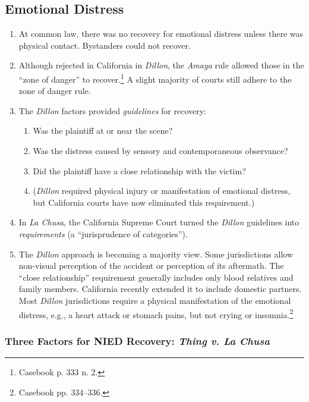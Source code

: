 \subsection{Emotional Distress}

\begin{enumerate}
    \item At common law, there was no recovery for emotional distress unless 
    there was physical contact. Bystanders could not recover.
    \item Although rejected in California in \emph{Dillon}, the \emph{Amaya} 
    rule allowed those in the ``zone of danger'' to recover.\footnote{Casebook 
    p. 333 n. 2.} A slight majority of courts still adhere to the zone of  
    danger rule.
    \item The \emph{Dillon} factors provided \emph{guidelines} for recovery:
    \begin{enumerate}
        \item Was the plaintiff at or near the scene?
        \item Was the distress caused by sensory and contemporaneous 
        observance?
        \item Did the plaintiff have a close relationship with the victim?
        \item (\emph{Dillon} required physical injury or manifestation of 
        emotional distress, but California courts have now eliminated this 
        requirement.)
    \end{enumerate}
    \item In \emph{La Chusa}, the California Supreme Court turned the 
    \emph{Dillon} guidelines into \emph{requirements} (a ``jurisprudence of 
    categories'').
    \item The \emph{Dillon} approach is becoming a majority view. Some 
    jurisdictions allow non-visual perception of the accident or perception of 
    its aftermath. The ``close relationship'' requirement generally includes 
    only blood relatives and family members. California recently extended it 
    to include domestic partners. Most \emph{Dillon} jurisdictions require a 
    physical manifestation of the emotional distress, e.g., a heart attack or 
    stomach pains, but not crying or insomnia.\footnote{Casebook pp.  
    334--336.}
\end{enumerate}

\subsubsection{Three Factors for NIED Recovery: \emph{Thing v. La Chusa}}

